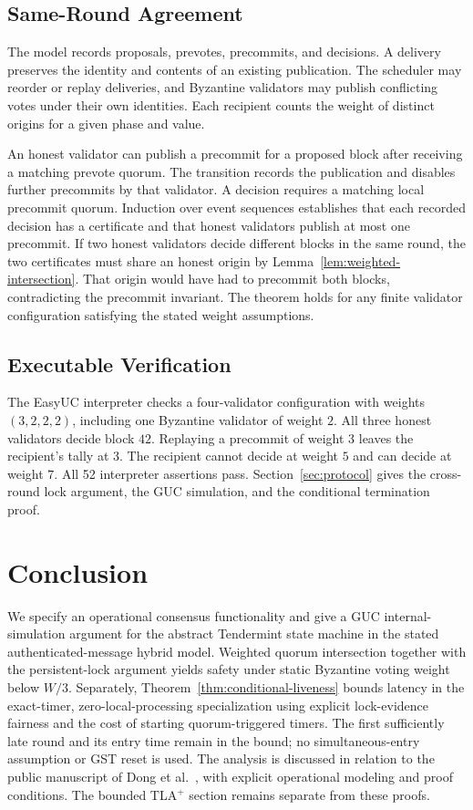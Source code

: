 \documentclass[conference,letterpaper,10pt]{IEEEtran}
\begin{document}
\subsection{Same-Round Agreement}

The model records proposals, prevotes, precommits, and decisions. A delivery preserves the identity and contents of an existing publication. The scheduler may reorder or replay deliveries, and Byzantine validators may publish conflicting votes under their own identities. Each recipient counts the weight of distinct origins for a given phase and value.

An honest validator can publish a precommit for a proposed block after receiving a matching prevote quorum. The transition records the publication and disables further precommits by that validator. A decision requires a matching local precommit quorum. Induction over event sequences establishes that each recorded decision has a certificate and that honest validators publish at most one precommit. If two honest validators decide different blocks in the same round, the two certificates must share an honest origin by Lemma~\ref{lem:weighted-intersection}. That origin would have had to precommit both blocks, contradicting the precommit invariant. The theorem holds for any finite validator configuration satisfying the stated weight assumptions.

\subsection{Executable Verification}

The EasyUC interpreter checks a four-validator configuration with weights $(3,2,2,2)$, including one Byzantine validator of weight $2$. All three honest validators decide block $42$. Replaying a precommit of weight $3$ leaves the recipient's tally at $3$. The recipient cannot decide at weight $5$ and can decide at weight $7$. All 52 interpreter assertions pass. Section~\ref{sec:protocol} gives the cross-round lock argument, the GUC simulation, and the conditional termination proof.

\section{Conclusion}\label{sec:conclusion}

We specify an operational consensus functionality and give a GUC internal-simulation argument for the abstract Tendermint state machine in the stated authenticated-message hybrid model. Weighted quorum intersection together with the persistent-lock argument yields safety under static Byzantine voting weight below $W/3$. Separately, Theorem~\ref{thm:conditional-liveness} bounds latency in the exact-timer, zero-local-processing specialization using explicit lock-evidence fairness and the cost of starting quorum-triggered timers. The first sufficiently late round and its entry time remain in the bound; no simultaneous-entry assumption or GST reset is used. The analysis is discussed in relation to the public manuscript of Dong et al.~\cite{dong2025uctendermint}, with explicit operational modeling and proof conditions. The bounded TLA$^+$ section remains separate from these proofs.
\end{document}
